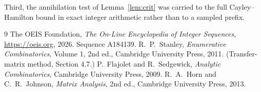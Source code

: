 \documentclass[11pt,a4paper]{article}
\theoremstyle{plain}
\theoremstyle{definition}
\begin{document}
Third, the annihilation test of Lemma~\ref{lem:crit} was carried to the full
Cayley--Hamilton bound in exact integer arithmetic rather than to a sampled prefix.

\begin{thebibliography}{9}
 The OEIS Foundation, \emph{The On-Line Encyclopedia of Integer
Sequences}, \url{https://oeis.org}, 2026. Sequence A184139.
 R.~P.~Stanley, \emph{Enumerative Combinatorics}, Volume 1, 2nd ed.,
Cambridge University Press, 2011. (Transfer-matrix method, Section 4.7.)
 P.~Flajolet and R.~Sedgewick, \emph{Analytic Combinatorics}, Cambridge
University Press, 2009.
 R.~A.~Horn and C.~R.~Johnson, \emph{Matrix Analysis}, 2nd ed., Cambridge
University Press, 2013.
\end{thebibliography}
\end{document}
